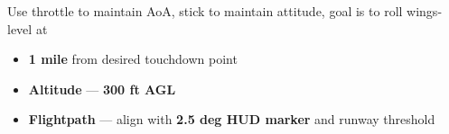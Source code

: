 \begin{checklistenumerate}
    \label{subsec:proc_basic:to_ldg:ldg:final}
    Use throttle to maintain AoA, stick to maintain attitude, goal is to roll wings-level at

    \begin{itemize}
        \item \textbf{1 mile} from desired touchdown point
        \item \textbf{Altitude} --- \textbf{300 ft AGL}
        \item \textbf{Flightpath} --- align  with \textbf{2.5 deg HUD marker} and runway threshold
    \end{itemize}
\end{checklistenumerate}

\clearpage

